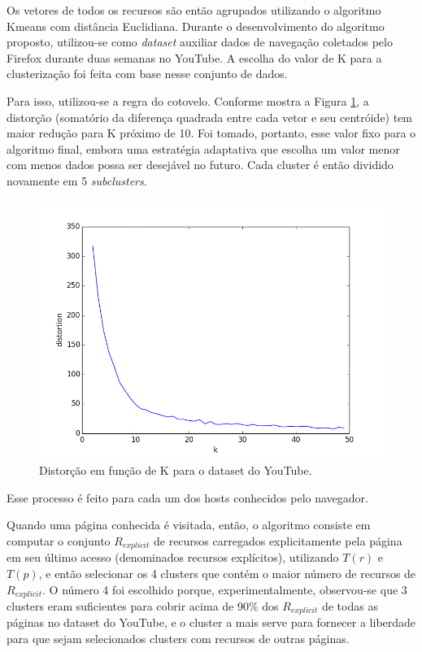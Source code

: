 \documentclass[10pt,twocolumn,letterpaper]{article}
\begin{document}
Os vetores de todos os recursos são então agrupados utilizando o algoritmo Kmeans com distância Euclidiana. Durante o desenvolvimento do algoritmo proposto, utilizou-se como \emph{dataset} auxiliar dados de navegação coletados pelo Firefox durante duas semanas no YouTube. A escolha do valor de K para a clusterização foi feita com base nesse conjunto de dados.

Para isso, utilizou-se a regra do cotovelo. Conforme mostra a Figura \ref{fig-youtube-elbow}, a distorção (somatório da diferença quadrada entre cada vetor e seu centróide) tem maior redução para K próximo de 10. Foi tomado, portanto, esse valor fixo para o algoritmo final, embora uma estratégia adaptativa que escolha um valor menor com menos dados possa ser desejável no futuro. Cada cluster é então dividido novamente em 5 \emph{subclusters}. 

\begin{figure}
	\begin{center}
     \includegraphics[width=0.99\columnwidth]{pics/youtube_elbow.png}
    \caption{Distorção em função de K para o dataset do YouTube.}
    \label{fig-youtube-elbow}   
	\end{center} 
\end{figure}

Esse processo é feito para cada um dos hosts conhecidos pelo navegador.

Quando uma página conhecida é visitada, então, o algoritmo consiste em computar o conjunto $R_{explicit}$ de recursos carregados explicitamente pela página em seu último acesso (denominados recursos explícitos), utilizando $T(r)$ e $T(p)$, e então selecionar os 4 clusters que contém o maior número de recursos de $R_{explicit}$. O número 4 foi escolhido porque, experimentalmente, observou-se que 3 clusters eram suficientes para cobrir acima de 90\% dos $R_{explicit}$ de todas as páginas no dataset do YouTube, e o cluster a mais serve para fornecer a liberdade para que sejam selecionados clusters com recursos de outras páginas.
\end{document}
